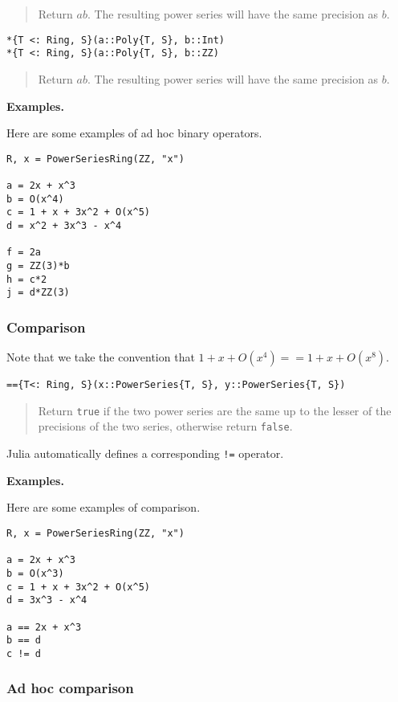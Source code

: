 \documentclass[a4paper,10pt]{article}
\newcommand{\code}{\lstinline}
\newcommand{\desc}[1]{\vspace{-3mm}\begin{quote}#1\end{quote}}
\begin{document}
{{{\desc{Return $ab$. The resulting power series will have the same precision as
$b$.}

\begin{lstlisting}
*{T <: Ring, S}(a::Poly{T, S}, b::Int)
*{T <: Ring, S}(a::Poly{T, S}, b::ZZ)
\end{lstlisting}

\desc{Return $ab$. The resulting power series will have the same precision as
$b$.}

\textbf{Examples.}

Here are some examples of ad hoc binary operators.

\begin{lstlisting}
R, x = PowerSeriesRing(ZZ, "x")

a = 2x + x^3
b = O(x^4)
c = 1 + x + 3x^2 + O(x^5)
d = x^2 + 3x^3 - x^4

f = 2a
g = ZZ(3)*b
h = c*2
j = d*ZZ(3)
\end{lstlisting}

\subsubsection{Comparison}

Note that we take the convention that $1 + x + O(x^4) == 1 + x + O(x^8)$. 

\begin{lstlisting}
=={T<: Ring, S}(x::PowerSeries{T, S}, y::PowerSeries{T, S})
\end{lstlisting}

\desc{Return \code{true} if the two power series are the same up to the lesser
of the precisions of the two series, otherwise return \code{false}.}

Julia automatically defines a corresponding \code{!=} operator.

\textbf{Examples.}

Here are some examples of comparison.

\begin{lstlisting}
R, x = PowerSeriesRing(ZZ, "x")

a = 2x + x^3
b = O(x^3)
c = 1 + x + 3x^2 + O(x^5)
d = 3x^3 - x^4

a == 2x + x^3
b == d
c != d
\end{lstlisting}

\subsubsection{Ad hoc comparison}

}}}
\end{document}
